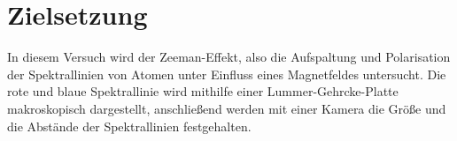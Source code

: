 \section{Zielsetzung}
\label{sec:Zielsetzung}
In diesem Versuch wird der Zeeman-Effekt, also die Aufspaltung und Polarisation der Spektrallinien von Atomen unter Einfluss eines Magnetfeldes untersucht.
Die rote und blaue Spektrallinie wird mithilfe einer Lummer-Gehrcke-Platte makroskopisch dargestellt, anschließend werden mit einer Kamera die Größe und die Abstände der Spektrallinien festgehalten.